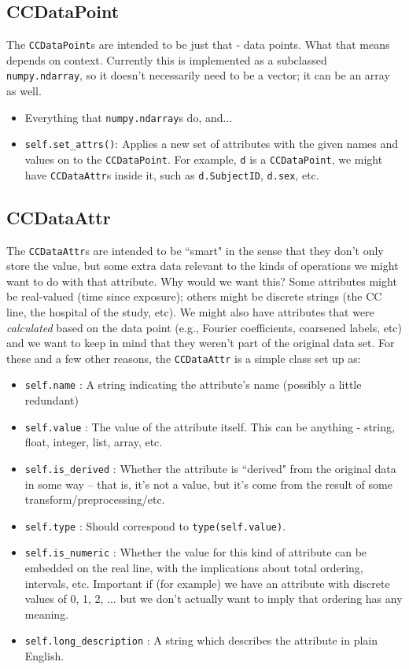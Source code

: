 \documentclass{article}
\newcommand{\ttt}{\texttt}
\begin{document}
\begin{itemize}
\end{itemize}

\subsection{CCDataPoint}
The \ttt{CCDataPoint}s are intended to be just that - data points. What that
means depends on context. Currently this is implemented as a subclassed
\ttt{numpy.ndarray}, so it doesn't necessarily need to be a vector; it can be
an array as well.
\begin{itemize}
\item Everything that \ttt{numpy.ndarray}s do, and...
\item \ttt{self.set\_attrs()}: Applies a new set of attributes with the given
names and values on to the \ttt{CCDataPoint}. For example, \ttt{d} is a
\ttt{CCDataPoint}, we might have \ttt{CCDataAttr}s inside it,
such as \ttt{d.SubjectID}, \ttt{d.sex}, etc.
\end{itemize}

\subsection{CCDataAttr}
The \ttt{CCDataAttr}s are intended to be ``smart" in the sense that
they don't only store the value, but some extra data relevant to the kinds
of operations we might want to do with that attribute. Why would we
want this? Some attributes might be real-valued (time since exposure);
others might be discrete strings (the CC line, the hospital of the study, etc).
We might also have attributes that were \emph{calculated} based on the
data point (e.g., Fourier coefficients, coarsened labels, etc) and we want to
keep in mind that they weren't part of the original data set. For these and
a few other reasons, the \ttt{CCDataAttr} is a simple class set up as:
%
\begin{itemize}
\item \ttt{self.name} : A string indicating the attribute's name (possibly a little redundant)
\item \ttt{self.value} : The value of the attribute itself. This can be anything - string, float, integer, list, array, etc.
\item \ttt{self.is\_derived} : Whether the attribute is ``derived" from the original data in some way -- that is, it's not
a value, but it's come from the result of some transform/preprocessing/etc.
\item \ttt{self.type} : Should correspond to \ttt{type(self.value)}.
\item \ttt{self.is\_numeric} : Whether the value for this kind of attribute can be
embedded on the real line, with the implications about total ordering, intervals, etc.
Important if (for example) we have an attribute with discrete values of 0, 1, 2, ... but
we don't actually want to imply that ordering has any meaning.
\item \ttt{self.long\_description} : A string which describes the attribute in plain English.
\end{itemize}
\end{document}
